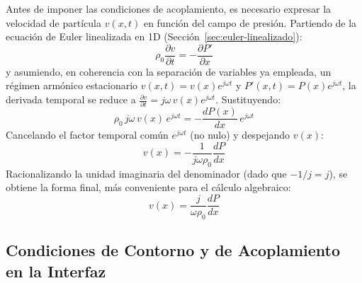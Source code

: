 \documentclass[11pt,letterpaper]{article}
\begin{document}
Antes de imponer las condiciones de acoplamiento, es necesario expresar la velocidad de partícula $v(x,t)$ en función del campo de presión. Partiendo de la ecuación de Euler linealizada en 1D (Sección~\ref{sec:euler-linealizado}):
\begin{equation}
    \rho_0 \frac{\partial v}{\partial t} = -\frac{\partial P'}{\partial x}
\end{equation}
y asumiendo, en coherencia con la separación de variables ya empleada, un régimen armónico estacionario $v(x,t) = v(x)e^{j\omega t}$ y $P'(x,t) = P(x)e^{j\omega t}$, la derivada temporal se reduce a $\frac{\partial v}{\partial t} = j\omega\, v(x) e^{j\omega t}$. Sustituyendo:
\begin{equation}
    \rho_0\, j\omega\, v(x)\, e^{j\omega t} = -\frac{dP(x)}{dx}\, e^{j\omega t}
\end{equation}
Cancelando el factor temporal común $e^{j\omega t}$ (no nulo) y despejando $v(x)$:
\begin{equation}
    v(x) = -\frac{1}{j\omega \rho_0} \frac{dP}{dx}
\end{equation}
Racionalizando la unidad imaginaria del denominador (dado que $-1/j = j$), se obtiene la forma final, más conveniente para el cálculo algebraico:
\begin{equation}
    v(x) = \frac{j}{\omega \rho_0} \frac{dP}{dx}
\end{equation}

\subsection{Condiciones de Contorno y de Acoplamiento en la Interfaz}
\end{document}
